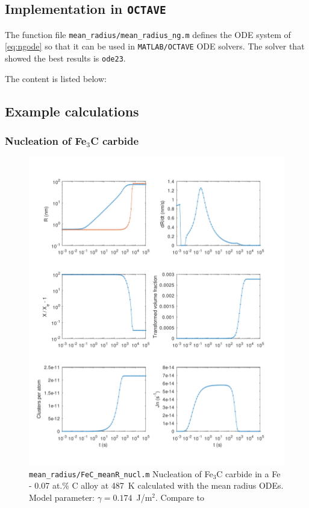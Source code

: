 \documentclass[12pt,a4paper]{article}
\begin{document}
\subsection{Implementation in \texttt{OCTAVE}}

The function file \texttt{mean\_radius/mean\_radius\_ng.m} defines the ODE system of \eqref{eq:ngode} so that it can be used in \texttt{MATLAB/OCTAVE} ODE solvers. The solver that showed the best results is \texttt{ode23}.

The content is listed below: 



\pagebreak

\subsection{Example calculations}

\subsubsection{Nucleation of Fe$_3$C carbide}

\begin{figure}[h]
\centering
\includegraphics[width=14cm]{../mean_radius/FeC_meanR_nucl.pdf} 
\caption{\texttt{mean\_radius/FeC\_meanR\_nucl.m} Nucleation of Fe$_3$C carbide in a Fe - 0.07 at.\% C alloy at 487~K calculated with the mean radius ODEs. Model parameter: $\gamma = 0.174$~J/m$^2$. Compare to \citet{Perez-2003-ID509}}
\end{figure}
\end{document}
